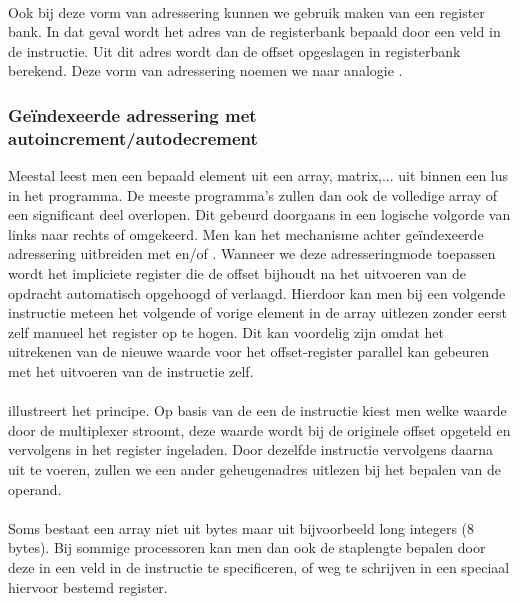 \paragraph{}
Ook bij deze vorm van adressering kunnen we gebruik maken van een register bank. In dat geval wordt het adres van de registerbank bepaald door een veld in de instructie. Uit dit adres wordt dan de offset opgeslagen in registerbank berekend. Deze vorm van adressering noemen we naar analogie .
\subsubsection{Ge\"indexeerde adressering met autoincrement/autodecrement}
Meestal leest men een bepaald element uit een array, matrix,... uit binnen een lus in het programma. De meeste programma's zullen dan ook de volledige array of een significant deel overlopen. Dit gebeurd doorgaans in een logische volgorde van links naar rechts of omgekeerd. Men kan het mechanisme achter ge\"indexeerde adressering uitbreiden met  en/of . Wanneer we deze adresseringmode toepassen wordt het impliciete register die de offset bijhoudt na het uitvoeren van de opdracht automatisch opgehoogd of verlaagd. Hierdoor kan men bij een volgende instructie meteen het volgende of vorige element in de array uitlezen zonder eerst zelf manueel het register op te hogen. Dit kan voordelig zijn omdat het uitrekenen van de nieuwe waarde voor het offset-register parallel kan gebeuren met het uitvoeren van de instructie zelf.
\paragraph{}
 illustreert het principe. Op basis van de een de instructie kiest men welke waarde door de multiplexer stroomt, deze waarde wordt bij de originele offset opgeteld en vervolgens in het register ingeladen. Door dezelfde instructie vervolgens daarna uit te voeren, zullen we een ander geheugenadres uitlezen bij het bepalen van de operand.
\paragraph{}
Soms bestaat een array niet uit bytes maar uit bijvoorbeeld long integers (8 bytes). Bij sommige processoren kan men dan ook de staplengte bepalen door deze in een veld in de instructie te specificeren, of weg te schrijven in een speciaal hiervoor bestemd register.
